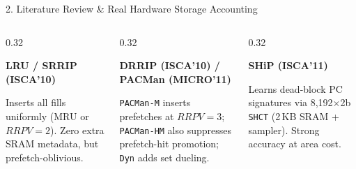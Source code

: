 \documentclass[aspectratio=169, 10pt]{beamer}
\begin{document}
\begin{frame}{2. Literature Review \& Real Hardware Storage Accounting}
  \vspace{-0.15cm}
  \begin{columns}[t, onlytextwidth]
    \begin{column}{0.32\textwidth}
      \begin{tcolorbox}[cleanpanel]
        {\footnotesize\textbf{\color{Obsidian}LRU / SRRIP (ISCA'10)}}\par\vspace{0.05cm}
        \scriptsize
        Inserts all fills uniformly (MRU or $RRPV=2$). Zero extra SRAM metadata, but prefetch-oblivious.
      \end{tcolorbox}
    \end{column}%
    \hfill%
    \begin{column}{0.32\textwidth}
      \begin{tcolorbox}[cleanpanel]
        {\footnotesize\textbf{\color{Obsidian}DRRIP (ISCA'10) / PACMan (MICRO'11)}}\par\vspace{0.05cm}
        \scriptsize
        \texttt{PACMan-M} inserts prefetches at $RRPV=3$; \texttt{PACMan-HM} also suppresses prefetch-hit promotion; \texttt{Dyn} adds set dueling.
      \end{tcolorbox}
    \end{column}%
    \hfill%
    \begin{column}{0.32\textwidth}
      \begin{tcolorbox}[cleanpanel]
        {\footnotesize\textbf{\color{Obsidian}SHiP (ISCA'11)}}\par\vspace{0.05cm}
        \scriptsize
        Learns dead-block PC signatures via 8,192$\times$2b \texttt{SHCT} (2\,KB SRAM + sampler). Strong accuracy at area cost.
      \end{tcolorbox}
    \end{column}
  \end{columns}


\end{frame}
\end{document}
